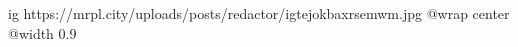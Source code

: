  
 
 
 
 

\ifcmt
  ig https://mrpl.city/uploads/posts/redactor/igtejokbaxrsemwm.jpg
  @wrap center
  @width 0.9
\fi
